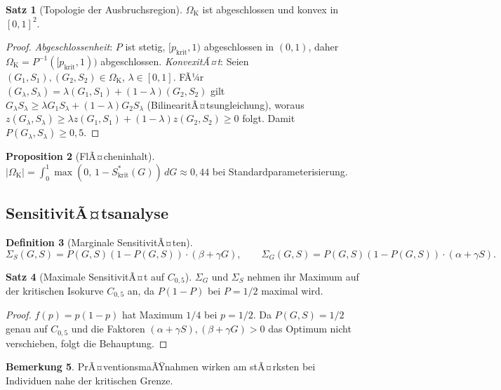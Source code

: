 ﻿\documentclass[12pt, a4paper]{article}
\theoremstyle{definition}
\newtheorem{definition}{Definition}[section]
\newtheorem{satz}[definition]{Satz}
\newtheorem{proposition}[definition]{Proposition}
\newtheorem{bemerkung}[definition]{Bemerkung}
\theoremstyle{remark}
\begin{document}
\begin{satz}[Topologie der Ausbruchsregion]
\label{satz:topologie}
$\Omega_{\mathrm{K}}$ ist abgeschlossen und konvex in $[0,1]^2$.
\end{satz}

\begin{proof}
\emph{Abgeschlossenheit}: $P$ ist stetig, $[p_{\mathrm{krit}},1)$ abgeschlossen in $(0,1)$,
daher $\Omega_{\mathrm{K}} = P^{-1}([p_{\mathrm{krit}},1))$ abgeschlossen.
\emph{KonvexitÃ¤t}: Seien $(G_1,S_1), (G_2,S_2) \in \Omega_{\mathrm{K}}$, $\lambda \in [0,1]$.
FÃ¼r $(G_\lambda, S_\lambda) = \lambda(G_1,S_1)+(1-\lambda)(G_2,S_2)$ gilt
$G_\lambda S_\lambda \geq \lambda G_1 S_\lambda + (1-\lambda)G_2 S_\lambda$
(BilinearitÃ¤tsungleichung), woraus $z(G_\lambda, S_\lambda) \geq \lambda z(G_1,S_1) + (1-\lambda)z(G_2,S_2) \geq 0$
folgt. Damit $P(G_\lambda,S_\lambda) \geq 0{,}5$.
\end{proof}

\begin{proposition}[FlÃ¤cheninhalt]
\label{prop:flaeche}
$|\Omega_{\mathrm{K}}| = \int_0^1 \max(0,\, 1 - S^*_{\mathrm{krit}}(G))\,dG \approx 0{,}44$
bei Standardparameterisierung.
\end{proposition}

\subsection{SensitivitÃ¤tsanalyse}

\begin{definition}[Marginale SensitivitÃ¤ten]
\label{def:sensitivitaet}
\[
  \Sigma_S(G,S) = P(G,S)(1-P(G,S))\cdot(\beta+\gamma G),
  \qquad
  \Sigma_G(G,S) = P(G,S)(1-P(G,S))\cdot(\alpha+\gamma S).
\]
\end{definition}

\begin{satz}[Maximale SensitivitÃ¤t auf $C_{0{,}5}$]
\label{satz:max_sensitivitaet}
$\Sigma_G$ und $\Sigma_S$ nehmen ihr Maximum auf der kritischen Isokurve $C_{0{,}5}$ an,
da $P(1-P)$ bei $P=1/2$ maximal wird.
\end{satz}

\begin{proof}
$f(p) = p(1-p)$ hat Maximum $1/4$ bei $p=1/2$. Da $P(G,S)=1/2$ genau auf $C_{0{,}5}$
und die Faktoren $(\alpha+\gamma S), (\beta+\gamma G) > 0$ das Optimum nicht verschieben,
folgt die Behauptung.
\end{proof}

\begin{bemerkung}
PrÃ¤ventionsmaÃŸnahmen wirken am stÃ¤rksten bei Individuen nahe der kritischen Grenze.
\end{bemerkung}
\end{document}
